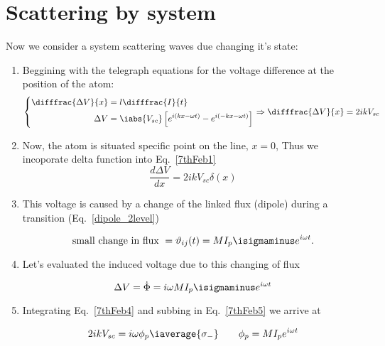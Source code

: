 \section{Scattering by system \cite{Astafiev2010}}
	Now we consider a system scattering waves due changing it's state:
	
	
 \begin{enumerate}
 	\item Beggining with the telegraph equations for the voltage difference at the position of the atom:
 	\begin{equation}\label{7thFeb1}
 	\left\lbrace\begin{aligned}
 	\difffrac{\Delta V}{x} & = l\difffrac{I}{t}\\
 	\Delta V & = \iabs{V_{sc}}\left[e^{i(kx - \omega t)} - e^{i(-kx - \omega t)}\right]
 	\end{aligned}\right. \Rightarrow \difffrac{\Delta V}{x} = 2ikV_{sc}
 	\end{equation}
 	
 	\item Now, the atom is situated specific point on the line, $ x = 0 $,  Thus we incoporate delta function into Eq.~\eqref{7thFeb1}
 	\begin{equation}\label{7thFeb4}
 	\frac{d\Delta V}{dx} = 2ikV_{sc}\delta(x)
 	\end{equation}
 	
 	\item This voltage is caused by a change of the linked flux (dipole) during a transition (Eq.~\eqref{dipole_2level})
 	
 	\begin{equation}\label{key}
 		\text{small change in flux } = \vartheta_{ij}(t) = MI_p\isigmaminus e^{i\omega t}.
 	\end{equation}
 	
 	\item Let's evaluated the induced voltage due to this changing of flux
 	
 	\begin{equation}\label{7thFeb5}
 		\Delta V = \dot{\Phi} = i\omega MI_p\isigmaminus e^{i\omega t}
 	\end{equation}
 	
 	\item Integrating Eq.~\eqref{7thFeb4} and subbing in Eq.~\eqref{7thFeb5} we arrive at
 	
 	\begin{equation}\label{7thFev5}
 	2ikV_{sc} = i\omega\phi_p\iaverage{\sigma_{-}}\qquad \phi_p = MI_pe^{i\omega t}
 	\end{equation}
 	
 \end{enumerate}